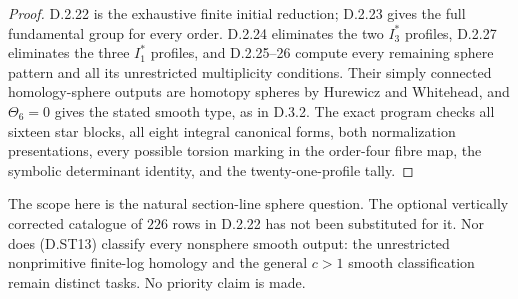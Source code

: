 \begin{proof}
D.2.22 is the exhaustive finite initial reduction; D.2.23 gives
the full fundamental group for every order. D.2.24 eliminates
the two $I_3^*$ profiles, D.2.27 eliminates the three $I_1^*$
profiles, and D.2.25--26 compute every remaining sphere pattern
and all its unrestricted multiplicity conditions. Their
simply connected homology-sphere outputs are homotopy spheres
by Hurewicz and Whitehead, and $\Theta_6=0$ gives the stated
smooth type, as in D.3.2. The exact program
 checks all sixteen
star blocks, all eight integral canonical forms, both
normalization presentations, every possible torsion marking
in the order-four fibre map, the symbolic determinant identity,
and the twenty-one-profile tally.
\end{proof}

The scope here is the natural section-line sphere question.
The optional vertically corrected catalogue of $226$ rows in
D.2.22 has not been substituted for it. Nor does (D.ST13)
classify every nonsphere smooth output: the unrestricted
nonprimitive finite-log homology and the general $c>1$ smooth
classification remain distinct tasks. No priority claim is made.
